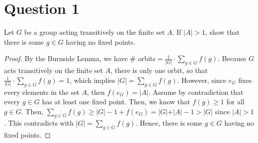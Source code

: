 \section{Question 1}

\begin{question}
    Let $G$ be a group acting transitively on the finite set $A$. If $|A|>1$, show that there is some $g \in G$ having no fixed points.
\end{question}

\begin{answer}
    \begin{proof}
        By the Burnside Lemma, we have \# orbits$ = \tfrac{1}{\lvert G \rvert}\cdot \sum_{g \in G}{f(g)}$. Because $G$ acts transitively on the finite set $A$, there is only one orbit, so that $\tfrac{1}{\lvert G \rvert} \cdot \sum_{g \in G}{f(g)} = 1$, which implies $\lvert G \rvert = \sum_{g \in G}{f(g)}$. However, since $e_G$ fixes every elements in the set $A$, then $f(e_G) = \lvert A \rvert$. Assume by contradiction that every $g \in G$ has at least one fixed point. Then, we know that $f(g) \geq 1$ for all \; $g \in G$. Then, $\sum_{g \in G}{f(g)} \geq \lvert G \rvert - 1 + f(e_G) = \lvert G \rvert + \rvert A \rvert - 1 > \lvert G \rvert$ since $\lvert A \rvert > 1$. This contradicts with $\lvert G \rvert = \sum_{g \in G}{f(g)}$. Hence, there is some $g \in G$ having no fixed points.
    \end{proof}
\end{answer}